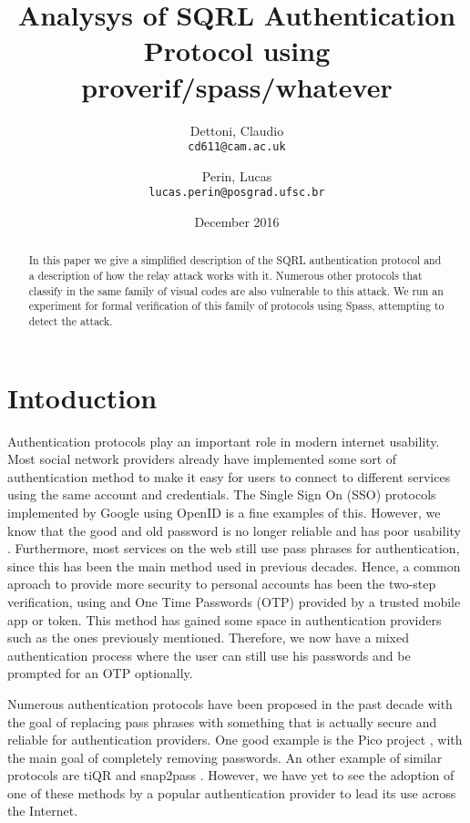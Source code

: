 \documentclass{article}
\title{Analysys of SQRL Authentication Protocol using proverif/spass/whatever}
\author{Dettoni, Claudio\\
	\texttt{cd611@cam.ac.uk}
	\and
	Perin, Lucas\\
	\texttt{lucas.perin@posgrad.ufsc.br}
}
\date{December 2016}
\begin{document}
\maketitle

\begin{abstract}
	In this paper we give a simplified description of the SQRL authentication
	protocol and a description of how the relay attack works with it. Numerous other
	protocols that classify in the same family of visual codes are also 
	vulnerable to this attack. We run an experiment for formal verification of 
	this family of protocols using Spass, attempting to detect the attack.
\end{abstract}

\section{Intoduction}
	Authentication protocols play an important role in modern internet
	usability. Most social network providers already have implemented
	some sort of authentication method to make it easy for users to connect
	to different services using the same account and credentials. The Single Sign On 
	(SSO) protocols implemented by Google using OpenID \cite{openid} is a
	fine examples of this. However, we know that the good and 
	old password is no longer reliable and has poor usability \cite{password}.
	Furthermore, most services on the web still use pass phrases for authentication,
	since this has been the main method used in previous decades. Hence,
	a common aproach to provide more security to personal accounts has 
	been the two-step verification, using and One Time Passwords (OTP) 
	provided by a trusted mobile app or token. This	method has gained some 
	space in authentication providers such as the
	ones previously mentioned. Therefore, we now have a mixed authentication process
	where the user can still use his passwords and be prompted for an
	OTP optionally.

	Numerous authentication protocols have been proposed in the past
	decade with the goal of replacing pass phrases with something that
	is actually secure and reliable for authentication providers. One
	good example is the Pico project \cite{pico}, with the main goal of
	completely removing passwords. An other example of similar protocols
	are tiQR \cite{tiqr} and snap2pass \cite{snap2pass}.
	However, we have yet to see the adoption of one of these methods
	by a popular authentication provider to lead its use across the
	Internet. 
\end{document}
